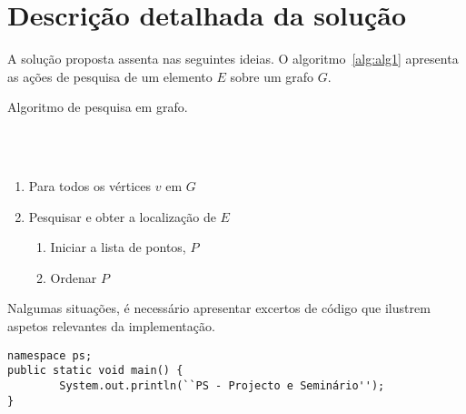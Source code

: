 \section{Descrição detalhada da solução} \label{sec33}
A solução proposta assenta nas seguintes ideias. O algoritmo~\ref{alg:alg1}
apresenta as ações de pesquisa de um elemento $E$ sobre um grafo $G$.
\begin{algorithm}
    \caption{Algoritmo de pesquisa em grafo.}
    \label{alg:alg1}
    \\
    \\
    \begin{enumerate}
        \item Para todos os vértices $v$ em $G$
        \item Pesquisar e obter a localização de $E$
        \begin{enumerate}
            \item Iniciar a lista de pontos, $P$
            \item Ordenar $P$
        \end{enumerate}
    \end{enumerate}
\end{algorithm}

Nalgumas situações, é necessário apresentar excertos de
código que ilustrem aspetos relevantes da implementação.

\begin{verbatim}
namespace ps;
public static void main() {
		System.out.println(``PS - Projecto e Seminário'');
}
\end{verbatim}
